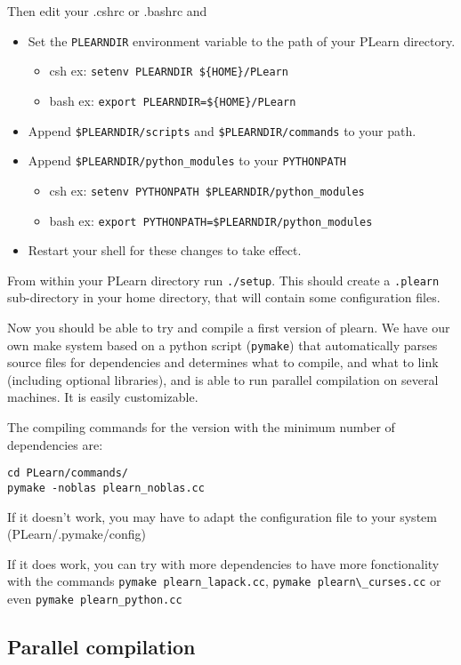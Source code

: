 \documentclass[11pt]{book}
\begin{document}
Then edit your .cshrc or .bashrc and 
\begin{itemize}
\item Set the {\tt PLEARNDIR} environment variable to the path of your PLearn directory. 
\begin{itemize}
\item csh ex: \verb!setenv PLEARNDIR ${HOME}/PLearn!
\item bash ex: \verb!export PLEARNDIR=${HOME}/PLearn!
\end{itemize}
\item Append \verb!$PLEARNDIR/scripts! and \verb!$PLEARNDIR/commands! to your path.
\item Append \verb!$PLEARNDIR/python_modules! to your \verb!PYTHONPATH!
\begin{itemize}
\item csh ex: \verb!setenv PYTHONPATH $PLEARNDIR/python_modules!
\item bash ex: \verb!export PYTHONPATH=$PLEARNDIR/python_modules!
\end{itemize}
\item Restart your shell for these changes to take effect.
\end{itemize}

From within your PLearn directory run {\tt ./setup}. This should create a
{\tt .plearn} sub-directory in your home directory, that will contain some
configuration files.

Now you should be able to try and compile a first version of plearn.
We have our own make system based on a python script ({\tt pymake}) that
automatically parses source files for dependencies and determines what to
compile, and what to link (including optional libraries), and is able to
run parallel compilation on several machines.  It is easily
customizable.

The compiling commands for the version with the minimum number of dependencies are:
\begin{verbatim}
cd PLearn/commands/
pymake -noblas plearn_noblas.cc
\end{verbatim}

If it doesn't work, you may have to adapt the configuration file to your system
(PLearn/.pymake/config)

If it does work, you can try with more dependencies to have more fonctionality with the commands \verb!pymake plearn_lapack.cc!, \verb!pymake plearn\_curses.cc! or even \verb!pymake plearn_python.cc!

\subsection{Parallel compilation}
\end{document}
